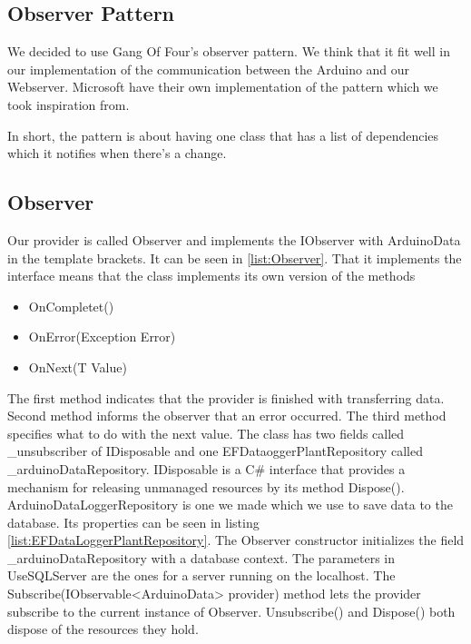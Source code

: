 \documentclass[a4paper,12pt,oneside,openright,titlepage]{book}
\begin{document}
\subsection{Observer Pattern}
We decided to use Gang Of Four's observer pattern\cite{GoF}. We think that it fit well in our implementation of the communication between the Arduino and our Webserver. Microsoft have their own implementation of the pattern\cite{MicrosoftObserver} which we took inspiration from.
 
In short, the pattern is about having one class that has a list of dependencies which it notifies when there's a change.

\subsection{Observer}
Our provider is called Observer and implements the IObserver with ArduinoData in the template brackets. It can be seen in \ref{list:Observer}. That it implements the interface means that the class implements its own version of the methods
\begin{itemize}
\item OnCompletet()
\item OnError(Exception Error)
\item OnNext(T Value)
\end{itemize}

The first method indicates that the provider is finished with transferring data. Second method informs the observer that an error occurred. The third method specifies what to do with the next value.
The class has two fields called \_unsubscriber of IDisposable and one EFDataoggerPlantRepository called \_arduinoDataRepository. IDisposable is a C\# interface that provides a mechanism for releasing unmanaged resources by its method Dispose(). ArduinoDataLoggerRepository is one we made which we use to save data to the database. Its properties can be seen in listing \ref{list:EFDataLoggerPlantRepository}. The Observer constructor initializes the field \_arduinoDataRepository with a database context. The parameters in UseSQLServer are the ones for a server running on the localhost. The Subscribe(IObservable<ArduinoData> provider) method lets the provider subscribe to the current instance of Observer. Unsubscribe() and Dispose() both dispose of the resources they hold. 
\end{document}
